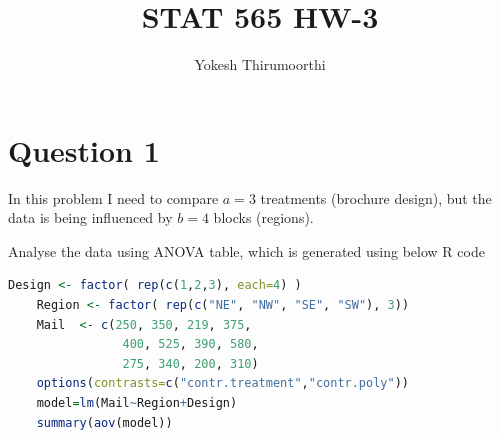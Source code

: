 \documentclass[11pt]{article}
\begin{document}
\title{STAT 565 HW-3}
\author{Yokesh Thirumoorthi}

\maketitle
\pagestyle{fancy}
\fancyhf{}

\section{Question 1}

In this problem I need to compare $\displaystyle a=3$ treatments (brochure design), 
but the data is being influenced by $\displaystyle b=4$ blocks (regions).











Analyse the data using ANOVA table, which is generated using below R code

\begin{lstlisting}[language=R]
    Design <- factor( rep(c(1,2,3), each=4) )
    Region <- factor( rep(c("NE", "NW", "SE", "SW"), 3))
    Mail  <- c(250, 350, 219, 375, 
                400, 525, 390, 580, 
                275, 340, 200, 310)
    options(contrasts=c("contr.treatment","contr.poly"))
    model=lm(Mail~Region+Design)
    summary(aov(model))    
\end{lstlisting}


\end{document}
